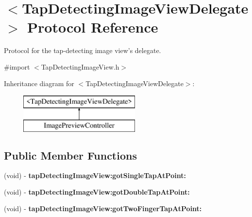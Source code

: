 \hypertarget{protocol_tap_detecting_image_view_delegate-p}{
\section{$<$\-Tap\-Detecting\-Image\-View\-Delegate$>$ \-Protocol \-Reference}
\label{protocol_tap_detecting_image_view_delegate-p}
}


\-Protocol for the tap-\/detecting image view's delegate.  




{\ttfamily \#import $<$\-Tap\-Detecting\-Image\-View.\-h$>$}

\-Inheritance diagram for $<$\-Tap\-Detecting\-Image\-View\-Delegate$>$\-:\begin{figure}[H]
\begin{center}
\leavevmode
\includegraphics[height=2.000000cm]{protocol_tap_detecting_image_view_delegate-p}
\end{center}
\end{figure}
\subsection*{\-Public \-Member \-Functions}
\begin{DoxyCompactItemize}
\item 
\hypertarget{protocol_tap_detecting_image_view_delegate-p_a48941d2081a72b3b403bfd2a74a9bcdd}{
(void) -\/ {\bfseries tap\-Detecting\-Image\-View\-:got\-Single\-Tap\-At\-Point\-:}}
\label{protocol_tap_detecting_image_view_delegate-p_a48941d2081a72b3b403bfd2a74a9bcdd}

\item 
\hypertarget{protocol_tap_detecting_image_view_delegate-p_a1c0710dfdbe26ca623fe243f4d6b604e}{
(void) -\/ {\bfseries tap\-Detecting\-Image\-View\-:got\-Double\-Tap\-At\-Point\-:}}
\label{protocol_tap_detecting_image_view_delegate-p_a1c0710dfdbe26ca623fe243f4d6b604e}

\item 
\hypertarget{protocol_tap_detecting_image_view_delegate-p_a681c6a18d26c64b1d600f9b36d1e16e2}{
(void) -\/ {\bfseries tap\-Detecting\-Image\-View\-:got\-Two\-Finger\-Tap\-At\-Point\-:}}
\label{protocol_tap_detecting_image_view_delegate-p_a681c6a18d26c64b1d600f9b36d1e16e2}

\end{DoxyCompactItemize}


